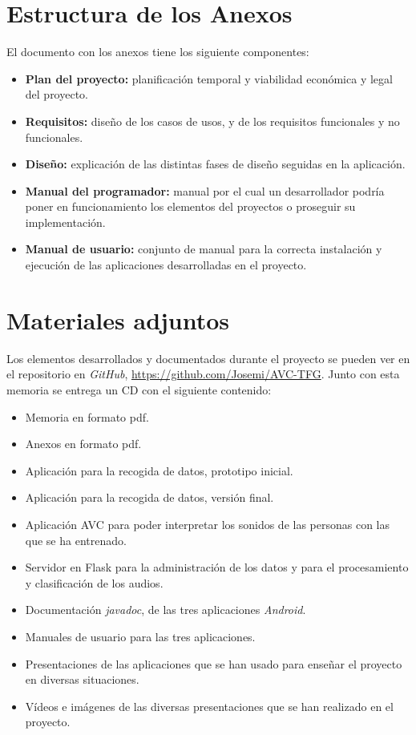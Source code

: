 \section{Estructura de los Anexos}
El documento con los anexos tiene los siguiente componentes:
\begin{itemize}
	\item
	\textbf{Plan del proyecto:} planificación temporal y viabilidad económica y legal del proyecto.
	\item
	\textbf{Requisitos:} diseño de los casos de usos, y de los requisitos funcionales y no funcionales.
	\item
	\textbf{Diseño:} explicación de las distintas fases de diseño seguidas en la aplicación.
	\item
	\textbf{Manual del programador:} manual por el cual un desarrollador podría poner en funcionamiento los elementos del proyectos o proseguir su implementación.
	\item
	\textbf{Manual de usuario:} conjunto de manual para la correcta instalación y ejecución de las aplicaciones desarrolladas en el proyecto.
\end{itemize}

\section{Materiales adjuntos}
Los elementos desarrollados y documentados durante el proyecto se pueden ver en el repositorio en \textit{GitHub}, \url{https://github.com/Josemi/AVC-TFG}.
Junto con esta memoria se entrega un CD con el siguiente contenido:
\begin{itemize}
	\item Memoria en formato pdf.
	\item Anexos en formato pdf.
	\item Aplicación para la recogida de datos, prototipo inicial.
	\item Aplicación para la recogida de datos, versión final.
	\item Aplicación AVC para poder interpretar los sonidos de las personas con las que se ha entrenado.
	\item Servidor en Flask para la administración de los datos y para el procesamiento y clasificación de los audios.
	\item Documentación \textit{javadoc}, de las tres aplicaciones \textit{Android}.
	\item Manuales de usuario para las tres aplicaciones.
	\item Presentaciones de las aplicaciones que se han usado para enseñar el proyecto en diversas situaciones.
	\item Vídeos e imágenes de las diversas presentaciones que se han realizado en el proyecto.
\end{itemize}	